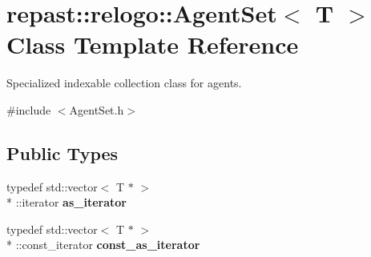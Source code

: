 \hypertarget{classrepast_1_1relogo_1_1_agent_set}{\section{repast\-:\-:relogo\-:\-:Agent\-Set$<$ T $>$ Class Template Reference}
\label{classrepast_1_1relogo_1_1_agent_set}
}


Specialized indexable collection class for agents.  




{\ttfamily \#include $<$Agent\-Set.\-h$>$}

\subsection*{Public Types}
\begin{DoxyCompactItemize}
\item 
\hypertarget{classrepast_1_1relogo_1_1_agent_set_a6acda82cc586e441101f7dad92287d9e}{typedef std\-::vector$<$ T $\ast$ $>$\\*
\-::iterator {\bfseries as\-\_\-iterator}}\label{classrepast_1_1relogo_1_1_agent_set_a6acda82cc586e441101f7dad92287d9e}

\item 
\hypertarget{classrepast_1_1relogo_1_1_agent_set_adf53a71e8dcab04db9bbca40a1dfeba3}{typedef std\-::vector$<$ T $\ast$ $>$\\*
\-::const\-\_\-iterator {\bfseries const\-\_\-as\-\_\-iterator}}\label{classrepast_1_1relogo_1_1_agent_set_adf53a71e8dcab04db9bbca40a1dfeba3}

\end{DoxyCompactItemize}
